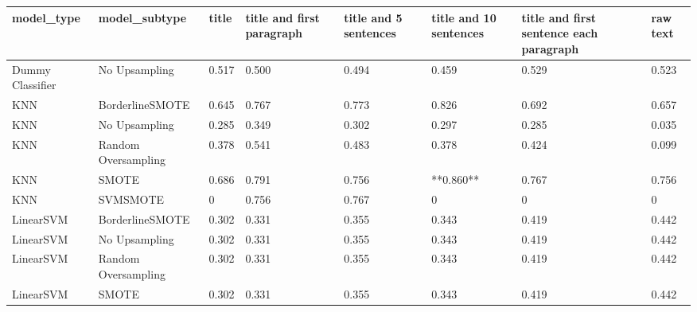 \begin{tabular}{llllllll}
\toprule
                  model\_type &       model\_subtype & title & title and first paragraph & title and 5 sentences & title and 10 sentences & title and first sentence each paragraph & raw text \\
\midrule
            Dummy Classifier &       No Upsampling & 0.517 &                     0.500 &                 0.494 &                  0.459 &                                   0.529 &    0.523 \\
                         KNN &     BorderlineSMOTE & 0.645 &                     0.767 &                 0.773 &                  0.826 &                                   0.692 &    0.657 \\
                         KNN &       No Upsampling & 0.285 &                     0.349 &                 0.302 &                  0.297 &                                   0.285 &    0.035 \\
                         KNN & Random Oversampling & 0.378 &                     0.541 &                 0.483 &                  0.378 &                                   0.424 &    0.099 \\
                         KNN &               SMOTE & 0.686 &                     0.791 &                 0.756 &              **0.860** &                                   0.767 &    0.756 \\
                         KNN &            SVMSMOTE &     0 &                     0.756 &                 0.767 &                      0 &                                       0 &        0 \\
                   LinearSVM &     BorderlineSMOTE & 0.302 &                     0.331 &                 0.355 &                  0.343 &                                   0.419 &    0.442 \\
                   LinearSVM &       No Upsampling & 0.302 &                     0.331 &                 0.355 &                  0.343 &                                   0.419 &    0.442 \\
                   LinearSVM & Random Oversampling & 0.302 &                     0.331 &                 0.355 &                  0.343 &                                   0.419 &    0.442 \\
                   LinearSVM &               SMOTE & 0.302 &                     0.331 &                 0.355 &                  0.343 &                                   0.419 &    0.442 \\

\end{tabular}
